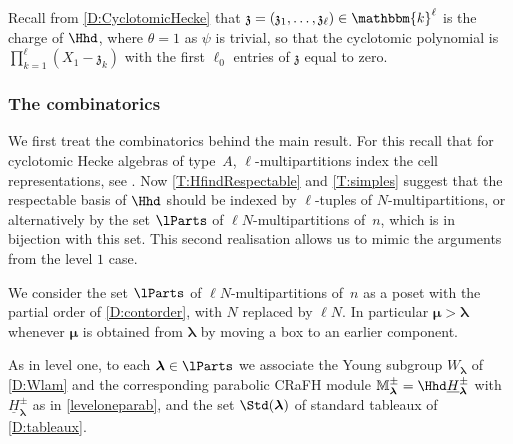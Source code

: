 \documentclass[a4paper,11pt]{amsart}
\newcommand\blam{{\boldsymbol\lambda}}
\newcommand\bmu{{\boldsymbol\mu}}
\numberwithin{equation}{subsection}
\theoremstyle{definition}
\theoremstyle{theorem}
\theoremstyle{remark}
\newcommand\charge{{\mathfrak{z}}}
\newcommand\kapp{{\mathfrak{z}}}
\newcommand\HJ{\underline{H}}
\newcommand\MJ{\mathbb{M}}
\newcommand\Sym{W}
\newcommand\kk{\mathbbm{k}}
\begin{document}
Recall from \autoref{D:CyclotomicHecke} that $\charge=(\kapp_1,\dots,\kapp_\ell)\in\kk^\ell$ is the charge of $\Hhd$, where $\theta=1$ as $\psi$ is trivial, so that the cyclotomic polynomial is $\prod_{k=1}^\ell(X_1-\kapp_k)$ with the first $\ell_0$ entries of $\charge$ equal to zero.

\subsubsection*{The combinatorics} We first treat the combinatorics behind the main result. For this recall that for cyclotomic Hecke algebras of type~$A$, $\ell$-multipartitions index the cell representations, see \cite{DJM:cyc}. Now \autoref{T:HfindRespectable} and \autoref{T:simples} suggest that the respectable basis of $\Hhd$ should be indexed by $\ell$-tuples of $N$-multipartitions, or alternatively by the set $\lParts$ of $\ell N$-multipartitions of~$n$, which is in bijection with this set. This second realisation allows us to mimic the arguments from the level $1$ case.

\begin{Definition}\label{D:lcontorder}
We consider the set $\lParts$ of $\ell N$-multipartitions of~$n$ as a poset with the partial order of \autoref{D:contorder}, with $N$ replaced by $\ell N$. In particular $\bmu>\blam$ whenever $\bmu$ is obtained from $\blam$ by moving a box to an earlier component.
\end{Definition}

As in level one, to each $\blam\in\lParts$ we associate the Young subgroup $\Sym_\blam$ of \autoref{D:Wlam} and the corresponding parabolic CRaFH module $\MJ^\pm_\blam=\Hhd\HJ^\pm_\blam$ with $\HJ^\pm_\blam$ as in \autoref{leveloneparab}, and the set $\Std(\blam)$ of standard tableaux of \autoref{D:tableaux}.
\end{document}
